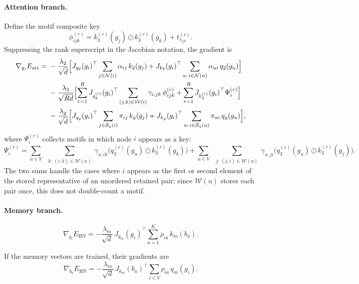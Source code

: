 \documentclass[11pt,a4paper]{article}
\begin{document}
\paragraph{Attention branch.}
Define the motif composite key
\begin{equation}
  \phi_{ijk}^{(r)}
  = k_3^{(r)}(g_j) \odot k_3^{(r)}(g_k) + t_{\tau_{ijk}}^{(r)}.
\end{equation}
Suppressing the rank superscript in the Jacobian notation, the gradient is
\begin{equation}
\begin{aligned}
  \nabla_{g_i} E_{\mathrm{att}}
  ={} &
  -\frac{\lambda_2}{\sqrt{d}}
  \Bigl[
    {J_{q_2}(g_i)}^\top \sum_{j \in \mathcal{N}(i)} \alpha_{ij}\,k_2(g_j)
    + {J_{k_2}(g_i)}^\top \sum_{u:\,i \in \mathcal{N}(u)} \alpha_{ui}\,q_2(g_u)
  \Bigr] \\
  &-\frac{\lambda_3}{\sqrt{Rd}}
  \Bigl[
    \sum_{r=1}^R {J_{q_3^{(r)}}(g_i)}^\top
      \sum_{(j,k)\in\mathcal{W}(i)} \gamma_{i,jk}\,\phi_{ijk}^{(r)}
    + \sum_{r=1}^R {J_{k_3^{(r)}}(g_i)}^\top \Psi_i^{(r)}
  \Bigr]\\
  &-\frac{\lambda_g}{\sqrt{d}}
  \Bigl[
    {J_{q_g}(g_i)}^\top \sum_{j \in \mathcal{S}_g(i)} \pi_{ij}\,k_g(g_j)
    + {J_{k_g}(g_i)}^\top \sum_{u:\,i \in \mathcal{S}_g(u)} \pi_{ui}\,q_g(g_u)
  \Bigr],
\end{aligned}
\end{equation}
where $\Psi_i^{(r)}$ collects motifs in which node $i$ appears as a key:
\begin{equation}
  \Psi_i^{(r)}
  = \sum_{u \in V}\; \sum_{\substack{k:\,(i,k)\in\mathcal{W}(u)}}
      \gamma_{u,ik}\bigl(q_3^{(r)}(g_u) \odot k_3^{(r)}(g_k)\bigr)
  +
    \sum_{u \in V}\; \sum_{\substack{j:\,(j,i)\in\mathcal{W}(u)}}
      \gamma_{u,ji}\bigl(q_3^{(r)}(g_u) \odot k_3^{(r)}(g_j)\bigr).
\end{equation}
The two sums handle the cases where $i$ appears as the first or second element
of the stored representative of an unordered retained pair; since
$\mathcal W(u)$ stores each pair once, this does not double-count a motif.

\paragraph{Memory branch.}
\begin{equation}
  \nabla_{g_i} E_{\mathrm{HN}}
  = -\frac{\lambda_m}{\sqrt{d}}\,
    {J_{q_m}(g_i)}^\top \sum_{a=1}^K \rho_{ia}\,k_m(b_a).
\end{equation}

If the memory vectors are trained, their gradients are
\begin{equation}
  \nabla_{b_a} E_{\mathrm{HN}}
  = -\frac{\lambda_m}{\sqrt{d}}\,
    {J_{k_m}(b_a)}^\top \sum_{i \in V} \rho_{ia}\,q_m(g_i).
\end{equation}



\end{document}
